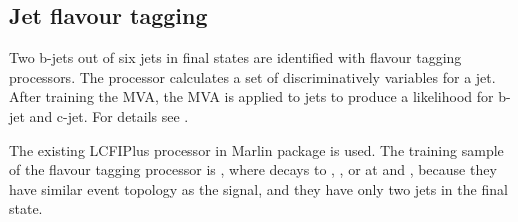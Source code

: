 \subsection{Jet flavour tagging}

Two b-jets out of six jets in \HepProcess final states are identified with flavour tagging processors. The processor calculates a set of discriminatively variables for a jet. After training the MVA, the MVA is applied to jets to produce a likelihood for b-jet and c-jet. For details see \Section{}.

The existing LCFIPlus processor in Marlin package is used. The training sample of the flavour tagging processor is \HepProcess{\Pem \Pep \to \PZ \Pnu \APnu}, where \PZ decays to \HepProcess{\qlight\Aqlight}, \HepProcess{\Pbottom\APbottom}, or \HepProcess{\Pcharm\APcharm} at  and , because they have similar event topology as the signal, and they have only two jets in the final state.

